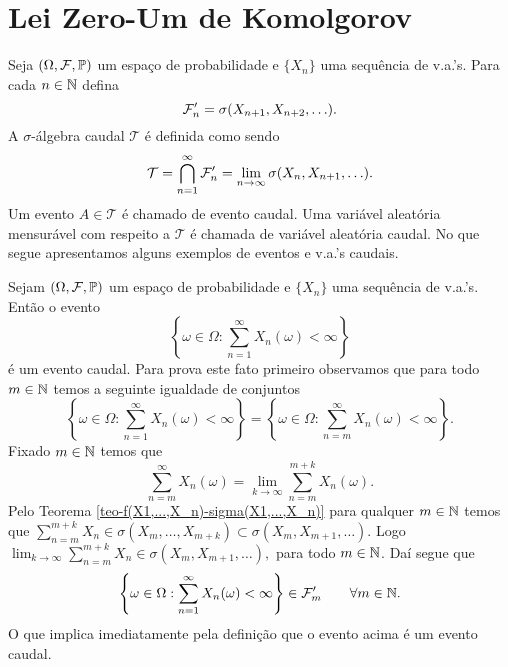 




















\section{Lei Zero-Um de Komolgorov}

Seja $(\Omega,\mathcal{F},\mathbb{P})$ um espaço de probabilidade e 
$\{X_n\}$ uma sequência de v.a.'s. 
Para cada $n\in\mathbb{N}$ defina
	\[
		\mathcal{F}_n' = \sigma( X_{n+1},X_{n+2},\ldots).
	\] 
A $\sigma$-álgebra caudal $\mathcal{T}$
é definida como sendo 
	\[
		\mathcal{T}
		=
		\bigcap_{n=1}^{\infty}
		\mathcal{F}_n'
		=
		\lim_{n\to\infty} \sigma(X_n,X_{n+1},\ldots).
	\]
Um evento $A\in\mathcal{T}$ é chamado de evento caudal.
Uma variável aleatória mensurável com respeito a $\mathcal{T}$
é chamada de variável aleatória caudal. 
No que segue apresentamos
alguns exemplos de eventos e v.a.'s caudais.

\begin{exemplo}
	Sejam $(\Omega,\mathcal{F},\mathbb{P})$ um espaço de probabilidade e
	$\{X_n\}$ uma sequência de v.a.'s. Então o evento 
		\[
			\left\{
			\omega\in \Omega: \sum_{n=1}^{\infty} X_n(\omega)<\infty
			\right\}
		\]
	é um evento caudal.
	Para prova este fato primeiro observamos 
	que para todo $m\in\mathbb{N}$ temos a seguinte 
	igualdade de conjuntos 
		\[
			\left\{
			\omega\in \Omega: \sum_{n=1}^{\infty} X_n(\omega)<\infty
			\right\}
			=
			\left\{
			\omega\in \Omega: \sum_{n=m}^{\infty} X_n(\omega)<\infty
			\right\}.
		\]
	Fixado $m\in \mathbb{N}$ temos que 
		\[
		\sum_{n=m}^{\infty} X_n(\omega)
		=
		\lim_{k\to\infty} \sum_{n=m}^{m+k} X_n(\omega).
		\]
	Pelo Teorema \ref{teo-f(X1,...,X_n)-sigma(X1,...,X_n)}
	para qualquer $m\in\mathbb{N}$ 
	temos que $\sum_{n=m}^{m+k} X_n \in \sigma(X_{m},\ldots,X_{m+k})
	\subset \sigma(X_{m},X_{m+1},\ldots)$. 
	Logo
	$
	\lim_{k\to\infty}\sum_{n=m}^{m+k} X_n
	\in
	\sigma(X_{m},X_{m+1},\ldots),
	$
	para todo $m\in \mathbb{N}$. 
	Daí segue que 
		\[
			\left\{
			\omega\in \Omega: \sum_{n=1}^{\infty} X_n(\omega)<\infty
			\right\}
			\in
			\mathcal{F}_m'
			\qquad
			\forall m\in\mathbb{N}.			
		\]
	O que implica imediatamente pela definição que o evento acima
	é um evento caudal.
\end{exemplo}


